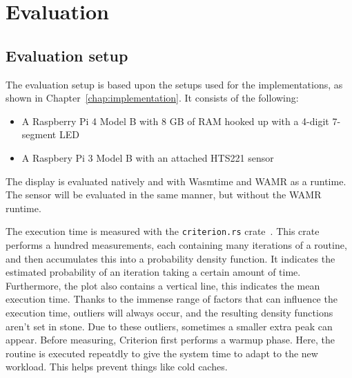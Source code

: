 \chapter{Evaluation}
\label{chap:evaluation}




\section{Evaluation setup}

The evaluation setup is based upon the setups used for the implementations, as shown in Chapter~\ref{chap:implementation}. It consists of the following:

\begin{itemize}
  \item A Raspberry Pi 4 Model B with 8 GB of RAM hooked up with a 4-digit 7-segment LED
  \item A Raspbery Pi 3 Model B with an attached HTS221 sensor
\end{itemize}

The display is evaluated natively and with Wasmtime and \gls{WAMR} as a runtime. The sensor will be evaluated in the same manner, but without the WAMR runtime.

The execution time is measured with the \texttt{criterion.rs} crate~\cite{gh:criterion}. This crate performs a hundred measurements, each containing many iterations of a routine, and then accumulates this into a probability density function. It indicates the estimated probability of an iteration taking a certain amount of time. Furthermore, the plot also contains a vertical line, this indicates the mean execution time. Thanks to the immense range of factors that can influence the execution time, outliers will always occur, and the resulting density functions aren't set in stone. Due to these outliers, sometimes a smaller extra peak can appear. Before measuring, Criterion first performs a warmup phase. Here, the routine is executed repeatdly to give the system time to adapt to the new workload. This helps prevent things like cold caches.

